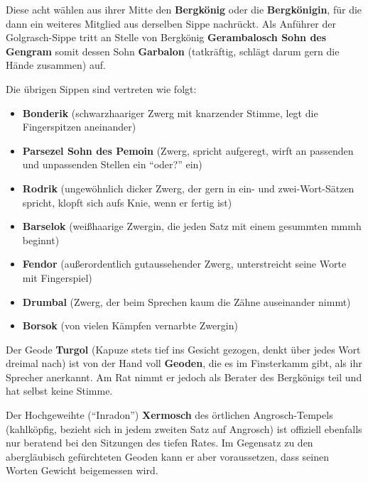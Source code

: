 Diese acht wählen aus ihrer Mitte den \textbf{Bergkönig} oder die \textbf{Bergkönigin}, für die dann ein weiteres Mitglied aus derselben Sippe nachrückt.
Als Anführer der Golgrasch-Sippe tritt an Stelle von Bergkönig \textbf{Gerambalosch Sohn des Gengram} somit dessen Sohn
\textbf{Garbalon} (tatkräftig, schlägt darum gern die Hände zusammen) auf.

\neuespalte

Die übrigen Sippen sind vertreten wie folgt:
\begin{itemize}
	\label{rat}
\item \textbf{Bonderik} (schwarzhaariger Zwerg mit knarzender Stimme, legt die Fingerspitzen aneinander)
\item \textbf{Parsezel Sohn des Pemoin} (Zwerg, spricht aufgeregt, wirft an passenden und unpassenden Stellen ein \enquote{oder?} ein)
\item \textbf{Rodrik} (ungewöhnlich dicker Zwerg, der gern in ein- und zwei-Wort-Sätzen spricht, klopft sich aufs Knie, wenn er fertig ist)
\item \textbf{Barselok} (weißhaarige Zwergin, die jeden Satz mit einem gesummten mmmh beginnt)
\item \textbf{Fendor} (außerordentlich gutaussehender Zwerg, unterstreicht seine Worte mit Fingerspiel)
\item \textbf{Drumbal} (Zwerg, der beim Sprechen kaum die Zähne auseinander nimmt)
\item \textbf{Borsok}  (von vielen Kämpfen vernarbte Zwergin)
\end{itemize}

Der Geode \textbf{Turgol} (Kapuze stets tief ins Gesicht gezogen, denkt über jedes Wort dreimal nach) ist von der Hand voll \textbf{Geoden}, die es im Finsterkamm gibt, als ihr Sprecher anerkannt.
Am Rat nimmt er jedoch als Berater des Bergkönigs teil und hat selbst keine Stimme.

Der Hochgeweihte (\enquote{Inradon}) \textbf{Xermosch} des örtlichen Angrosch-Tempels 
(kahlköpfig, bezieht sich in jedem zweiten Satz auf Angrosch) ist offiziell ebenfalls nur beratend bei den Sitzungen des tiefen Rates.
Im Gegensatz zu den abergläubisch gefürchteten Geoden kann er aber voraussetzen, dass seinen Worten Gewicht beigemessen wird.


